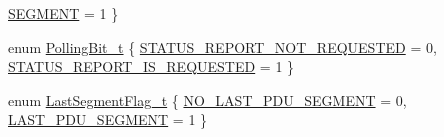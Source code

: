 \begin{DoxyCompactItemize}
\hyperlink{classns3_1_1LteRlcAmHeader_aa7a03eaac5875a18c2f95d3a0091d138a81153e1c386467eae03f6805ba812b83}{S\+E\+G\+M\+E\+NT} = 1
 \}
\item 
enum \hyperlink{classns3_1_1LteRlcAmHeader_a06187336c96896fc4de926e99ed4489e}{Polling\+Bit\+\_\+t} \{ \hyperlink{classns3_1_1LteRlcAmHeader_a06187336c96896fc4de926e99ed4489ea747520569cdac2a16d0cb2dade280942}{S\+T\+A\+T\+U\+S\+\_\+\+R\+E\+P\+O\+R\+T\+\_\+\+N\+O\+T\+\_\+\+R\+E\+Q\+U\+E\+S\+T\+ED} = 0, 
\hyperlink{classns3_1_1LteRlcAmHeader_a06187336c96896fc4de926e99ed4489eaccbbecabb140527ecb181c55db4e309d}{S\+T\+A\+T\+U\+S\+\_\+\+R\+E\+P\+O\+R\+T\+\_\+\+I\+S\+\_\+\+R\+E\+Q\+U\+E\+S\+T\+ED} = 1
 \}
\item 
enum \hyperlink{classns3_1_1LteRlcAmHeader_a02bef898cceaabdd21d7b93ef77c727b}{Last\+Segment\+Flag\+\_\+t} \{ \hyperlink{classns3_1_1LteRlcAmHeader_a02bef898cceaabdd21d7b93ef77c727bae0abac72b7b2999a9deef3eb21ceb8bd}{N\+O\+\_\+\+L\+A\+S\+T\+\_\+\+P\+D\+U\+\_\+\+S\+E\+G\+M\+E\+NT} = 0, 
\hyperlink{classns3_1_1LteRlcAmHeader_a02bef898cceaabdd21d7b93ef77c727ba99aff9b2f33113b920f64b4dce7af643}{L\+A\+S\+T\+\_\+\+P\+D\+U\+\_\+\+S\+E\+G\+M\+E\+NT} = 1
 \}
\end{DoxyCompactItemize}
